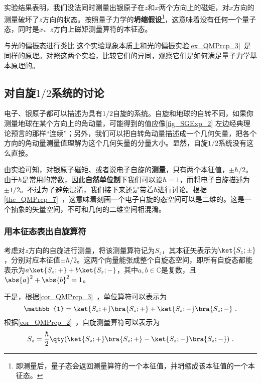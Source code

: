 实验结果表明，我们没法同时测量出银原子在$z$和$x$两个方向上的磁矩，对$x$方向的测量破坏了$z$方向的状态。按照量子力学的\textbf{坍缩假设}\footnote{即测量后，量子态会返回测量算符的一个本征值，并坍缩成该本征值的一个本征态。}，这意味着没有任何一个量子态，同时是$x$、$z$方向上磁矩测量算符的本征态。



\begin{exercise}{与光的偏振态进行类比}
这个实验现象本质上和光的偏振实验\autoref{ex_QMPrcp_3}~是同样的原理。对照这两个实验，比较它们的异同，观察它们是如何满足量子力学基本原理的。
\end{exercise}






\subsection{对自旋$1/2$系统的讨论}

电子、银原子都可以描述为具有$1/2$自旋的系统。自旋和地球的自转不同，如果你测量地球在某个方向上的角动量，可能得到的值应像\autoref{fig_SGExp_2} 左边经典理论预言的那样“连续”；另外，我们可以把自转角动量描述成一个几何矢量，把各个方向的角动量测量值理解为这个几何矢量的分量大小。显然，自旋$1/2$系统没有这么直接。

由实验可知，对银原子磁矩、或者说电子自旋的\textbf{测量}，只有两个本征值，$\pm\hbar/2$。由于$\hbar$是常用的常数，因此\textbf{自然单位制}下我们可以设$\hbar=1$，而将电子自旋描述为$\pm 1/2$。不过为了避免混淆，我们接下来还是带着$\hbar$进行讨论。根据\autoref{the_QMPrcp_7}~，这意味着刻画一个电子自旋的态空间可以是二维的。这是一个抽象的矢量空间，不可和几何的二维空间相混淆。

\subsubsection{用本征态表出自旋算符}

考虑对$z$方向的自旋进行测量，将该测量算符记为$S_z$，其本征矢表示为$\ket{S_z; \pm}$，分别对应本征值$\pm \hbar/2$。这两个向量能张成整个自旋态空间，即所有自旋态都能表示为$a\ket{S_z; +}+b\ket{S_z; -}$，其中$a, b\in\mathbb{C}$是复数，且$\abs{a}^2+\abs{b}^2=1$。

于是，根据\autoref{cor_QMPrcp_3}~，单位算符可以表示为
\begin{equation}
\mathbb{1}=\ket{S_z; +}\bra{S_z; +} + \ket{S_z; -}\bra{S_z; -}~.
\end{equation}
根据\autoref{cor_QMPrcp_2}~，自旋测量算符可以表示为
\begin{equation}
S_z=\frac{\hbar}{2}\qty(\ket{S_z; +}\bra{S_z; +} - \ket{S_z; -}\bra{S_z; -})~.
\end{equation}

